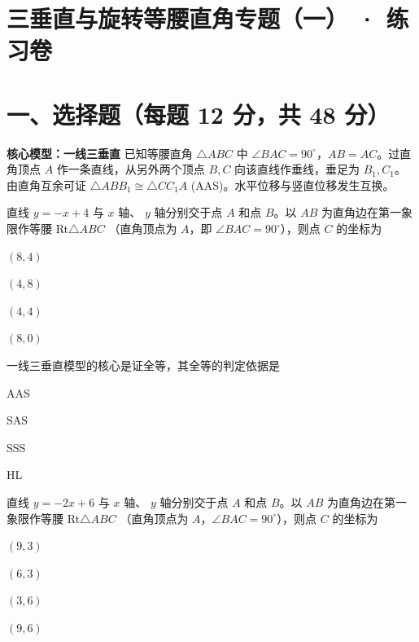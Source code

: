 \documentclass{exam-zh}
\begin{document}
\section*{三垂直与旋转等腰直角专题（一） · 练习卷}

\section*{一、选择题（每题 12 分，共 48 分）}


\begin{keyideabox}
  \textbf{核心模型：一线三垂直}
  已知等腰直角 $\triangle ABC$ 中 $\angle BAC = 90^\circ$，$AB = AC$。过直角顶点 $A$ 作一条直线，从另外两个顶点 $B, C$ 向该直线作垂线，垂足为 $B_1, C_1$。由直角互余可证 $\triangle ABB_1 \cong \triangle CC_1A$ (AAS)。水平位移与竖直位移发生互换。
\end{keyideabox}



\begin{question}[points=12]
  直线 $y = -x + 4$ 与 $x$ 轴、 $y$ 轴分别交于点 $A$ 和点 $B$。以 $AB$ 为直角边在第一象限作等腰 Rt$\triangle ABC$ （直角顶点为 $A$，即 $\angle BAC = 90^\circ$），则点 $C$ 的坐标为
  \begin{choices}
    \item $(8, 4)$
    \item $(4, 8)$
    \item $(4, 4)$
    \item $(8, 0)$
  \end{choices}
\end{question}



\begin{question}[points=12]
  一线三垂直模型的核心是证全等，其全等的判定依据是
  \begin{choices}
    \item AAS
    \item SAS
    \item SSS
    \item HL
  \end{choices}
\end{question}



\begin{question}[points=12]
  直线 $y = -2x + 6$ 与 $x$ 轴、 $y$ 轴分别交于点 $A$ 和点 $B$。以 $AB$ 为直角边在第一象限作等腰 Rt$\triangle ABC$ （直角顶点为 $A$，$\angle BAC = 90^\circ$），则点 $C$ 的坐标为
  \begin{choices}
    \item $(9, 3)$
    \item $(6, 3)$
    \item $(3, 6)$
    \item $(9, 6)$
  \end{choices}
\end{question}
\end{document}
